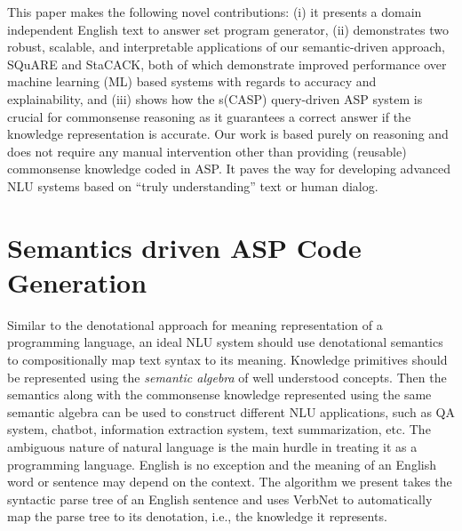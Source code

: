 \documentclass[letterpaper]{article}
\begin{document}
This paper makes the following novel contributions: (i) it presents a domain independent English text to answer set program generator, (ii) demonstrates two robust, scalable, and interpretable applications of our semantic-driven approach, SQuARE and StaCACK, both of which
demonstrate improved performance over machine learning (ML) based systems with regards to accuracy and explainability,
and (iii) shows how the s(CASP) query-driven ASP system is crucial for commonsense reasoning as it guarantees a correct answer if the knowledge representation is accurate.
Our work is based purely on reasoning and does not require any manual intervention other than providing (reusable) commonsense knowledge coded in ASP. It paves the way for developing advanced NLU systems based on ``truly understanding''  text or human dialog.

\section{Semantics driven ASP Code Generation}
Similar to the denotational approach for meaning representation of a programming language, an ideal NLU system should use denotational semantics to compositionally map text syntax to its meaning. Knowledge primitives should be represented using the \textit{semantic algebra} \cite{d_semantics} of  well understood concepts. Then the semantics along with the commonsense knowledge represented using the same semantic algebra can be used to construct different NLU applications, such as QA system, chatbot, information extraction system, text summarization, etc. The ambiguous nature of natural language is the main hurdle in treating it as a programming language. English is no exception and the meaning of an English word or sentence may depend on the context. The algorithm we present takes the syntactic parse tree of an English sentence and uses VerbNet to automatically map the parse tree to its denotation, i.e., the knowledge it represents.
\end{document}
